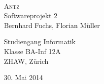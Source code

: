 




\begin{titlepage} \mbox{}\vspace{3\baselineskip}\\ \rmfamily\huge \centering %
   \textsc{Antz} \\[2ex] Softwareprojekt 2 \rmfamily\Large
   \vspace{1\baselineskip}\\ %
   \vspace{5\baselineskip} \rmfamily\Large Bernhard Fuchs, Florian Müller \\
   \vspace{10\baselineskip} \begin{large} Studiengang Informatik \\ Klasse
   BA-Inf 12A \\ ZHAW, Zürich \\ \end{large} \vspace{5\baselineskip} 30. Mai
   2014 \end{titlepage}




%
